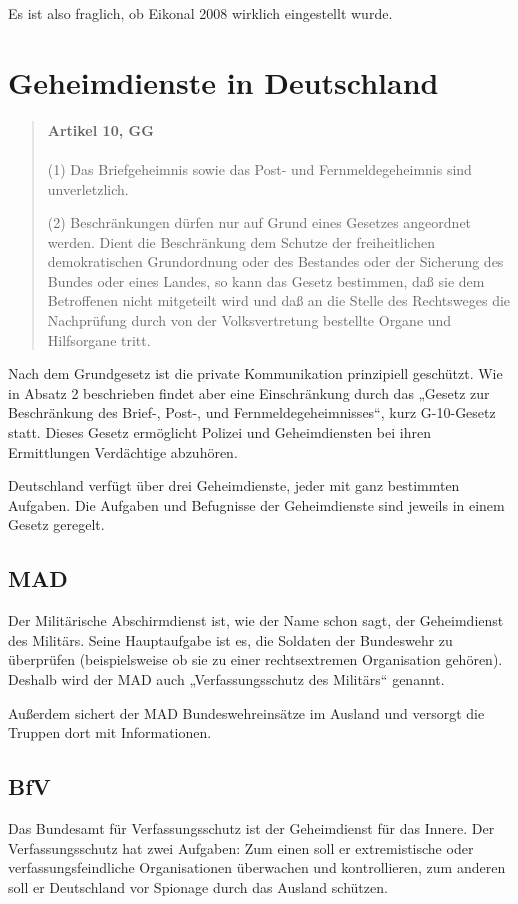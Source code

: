\documentclass[12pt,a4paper]{scrartcl}
\begin{document}
Es ist also fraglich, ob Eikonal 2008 wirklich eingestellt wurde.

\section{Geheimdienste in Deutschland}
\begin{quote}
\textbf{Artikel 10, GG} \\ \\
(1) Das Briefgeheimnis sowie das Post- und Fernmeldegeheimnis sind unverletzlich.

(2) Beschränkungen dürfen nur auf Grund eines Gesetzes angeordnet werden. Dient die Beschränkung dem Schutze der freiheitlichen demokratischen Grundordnung oder des Bestandes oder der Sicherung des Bundes oder eines Landes, so kann das Gesetz bestimmen, daß sie dem Betroffenen nicht mitgeteilt wird und daß an die Stelle des Rechtsweges die Nachprüfung durch von der Volksvertretung bestellte Organe und Hilfsorgane tritt.
\end{quote}

Nach dem Grundgesetz ist die private Kommunikation prinzipiell geschützt. Wie in Absatz 2 beschrieben findet aber eine Einschränkung durch das „Gesetz zur Beschränkung des Brief-, Post-, und Fernmeldegeheimnisses“, kurz G-10-Gesetz statt. Dieses Gesetz ermöglicht Polizei und Geheimdiensten bei ihren Ermittlungen Verdächtige abzuhören.

Deutschland verfügt über drei Geheimdienste, jeder mit ganz bestimmten Aufgaben. Die Aufgaben und Befugnisse der Geheimdienste sind jeweils in einem Gesetz geregelt.
\subsection{MAD}
Der Militärische Abschirmdienst ist, wie der Name schon sagt, der Geheimdienst des Militärs. Seine Hauptaufgabe ist es, die Soldaten der Bundeswehr zu überprüfen (beispielsweise ob sie zu einer rechtsextremen Organisation gehören). Deshalb wird der MAD auch „Verfassungsschutz des Militärs“ genannt.\cite{ard_geheimdienste}

Außerdem sichert der MAD Bundeswehreinsätze im Ausland und versorgt die Truppen dort mit Informationen.\cite{ard_geheimdienste}

\subsection{BfV}
Das Bundesamt für Verfassungsschutz ist der Geheimdienst für das Innere. Der Verfassungsschutz hat zwei Aufgaben: Zum einen soll er extremistische oder verfassungsfeindliche Organisationen überwachen und kontrollieren, zum anderen soll er Deutschland vor Spionage durch das Ausland schützen.\cite{ard_geheimdienste}
\end{document}
